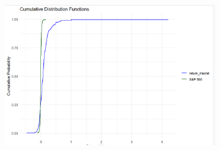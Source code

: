 \documentclass{article}
\begin{document}
\begin{figure}[H]
\begin{subfigure}{0.45\textwidth}
        \label{fig:image29}
    \end{subfigure}
    \hspace{0.05\textwidth}
    \begin{subfigure}{0.45\textwidth}
        \centering
        \includegraphics[width=\textwidth]{30.png}
        \label{fig:image30}
    \end{subfigure}


\end{figure}
\end{document}
